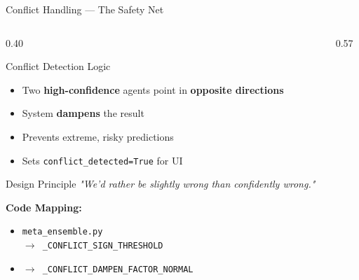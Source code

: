 \documentclass[aspectratio=169]{beamer}
\begin{document}
\begin{frame}{Conflict Handling — The Safety Net}
\begin{columns}[T]
  \begin{column}{0.40\textwidth}
    \begin{alertblock}{Conflict Detection Logic}
      \begin{itemize}\setlength\itemsep{3pt}
        \item Two \textbf{high-confidence} agents point in \textbf{opposite directions}
        \item System \textbf{dampens} the result
        \item Prevents extreme, risky predictions
        \item Sets \texttt{conflict\_detected=True} for UI
      \end{itemize}
    \end{alertblock}
    \vspace{0.2cm}
    \begin{block}{Design Principle}
      \textit{"We'd rather be slightly wrong than confidently wrong."}
    \end{block}
    \vspace{0.2cm}
    \textbf{Code Mapping:}
    \begin{itemize}
      \item \texttt{meta\_ensemble.py}\\
            \texttt{$\to$ \_CONFLICT\_SIGN\_THRESHOLD}
      \item \texttt{$\to$ \_CONFLICT\_DAMPEN\_FACTOR\_NORMAL}
    \end{itemize}
  \end{column}
  \begin{column}{0.57\textwidth}
    \centering
\end{column}
\end{columns}
\end{frame}
\end{document}
